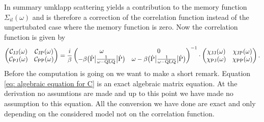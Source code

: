 In summary umklapp scattering yields a contribution to the memory function $\Sigma_{il}(\omega)$ and is therefore a correction of the correlation function instead of the unpertubated case where the memory function is zero.
Now the correlation function is given by
%
\begin{align}
	\begin{pmatrix}
	\mathcal{C}_{\mathrm{JJ}}(\omega) &  \mathcal{C}_{\mathrm{JP}}(\omega) \\
	\mathcal{C}_{\mathrm{PJ}}(\omega) &  \mathcal{C}_{\mathrm{PP}}(\omega)
	\end{pmatrix}
	=
	\frac{i}{\beta}
	\begin{pmatrix}
	\omega & 0 \\
	- \beta \big({\dot{\mathrm{P}}}\big| \frac{1}{\omega - \mathrm{QLQ}} \big|{\dot{\mathrm{P}}}\big) & \omega - \beta \big({\dot{\mathrm{P}}}\big| \frac{1}{\omega - \mathrm{QLQ}} \big|{\dot{\mathrm{P}}}\big)
	\end{pmatrix}^{-1}
	\cdot
	\begin{pmatrix}
	\chi_{\mathrm{JJ}}(\omega) &  \chi_{\mathrm{JP}}(\omega) \\
	\chi_{\mathrm{PJ}}(\omega) &  \chi_{\mathrm{PP}}(\omega)
	\end{pmatrix}
	.
\end{align}
%
Before the computation is going on we want to make a short remark.
Equation \eqref{eq: algebraic equation for C} is an exact algebraic matrix equation.
At the derivation no assumtions are made and up to this point we have made no assumption to this equation.
All the conversion we have done are exact and only depending on the considered model not on the correlation function.




































